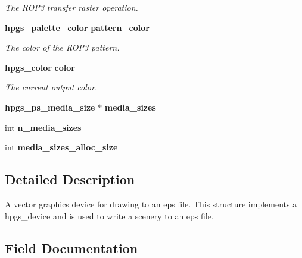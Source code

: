 \begin{DoxyCompactItemize}
\begin{DoxyCompactList}\small\item\em The ROP3 transfer raster operation. \item\end{DoxyCompactList}\item 
{\bf hpgs\_\-palette\_\-color} {\bf pattern\_\-color}\label{structhpgs__eps__device__st_adfb015c261644a5faa40a438efcefc2e}

\begin{DoxyCompactList}\small\item\em The color of the ROP3 pattern. \item\end{DoxyCompactList}\item 
{\bf hpgs\_\-color} {\bf color}\label{structhpgs__eps__device__st_aca327facc8998124ab6a9689ede14c14}

\begin{DoxyCompactList}\small\item\em The current output color. \item\end{DoxyCompactList}\end{DoxyCompactItemize}
\begin{Indent}{\bf }\par
{\em \label{_amgrpd41d8cd98f00b204e9800998ecf8427e}
 }\begin{DoxyCompactItemize}
\item 
{\bf hpgs\_\-ps\_\-media\_\-size} $\ast$ {\bf media\_\-sizes}
\item 
int {\bf n\_\-media\_\-sizes}
\item 
int {\bfseries media\_\-sizes\_\-alloc\_\-size}\label{structhpgs__eps__device__st_a72089500083511841858f7b6727b2799}

\end{DoxyCompactItemize}
\end{Indent}


\subsection{Detailed Description}
A vector graphics device for drawing to an eps file. This structure implements a {\ttfamily hpgs\_\-device} and is used to write a scenery to an eps file. 

\subsection{Field Documentation}

